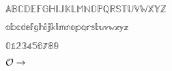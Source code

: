 \documentclass{article}
\begin{document}
$\mathbb{A} \mathbb{B} \mathbb{C} \mathbb{D} \mathbb{E} \mathbb{F} \mathbb{G} \mathbb{H} \mathbb{I} \mathbb{J} \mathbb{K} \mathbb{L} \mathbb{M} \mathbb{N} \mathbb{O} \mathbb{P} \mathbb{Q} \mathbb{R} \mathbb{S} \mathbb{T} \mathbb{U} \mathbb{V} \mathbb{W} \mathbb{X} \mathbb{Y} \mathbb{Z}$

$\mathbb{a} \mathbb{b} \mathbb{c} \mathbb{d} \mathbb{e} \mathbb{f} \mathbb{g} \mathbb{h} \mathbb{i} \mathbb{j} \mathbb{k} \mathbb{l} \mathbb{m} \mathbb{n} \mathbb{o} \mathbb{p} \mathbb{q} \mathbb{r} \mathbb{s} \mathbb{t} \mathbb{u} \mathbb{v} \mathbb{w} \mathbb{x} \mathbb{y} \mathbb{z}$

$\mathbb{0} \mathbb{1} \mathbb{2} \mathbb{3} \mathbb{4} \mathbb{5} \mathbb{6} \mathbb{7} \mathbb{8} \mathbb{9}$

$\cal{O} \rightarrow$
\end{document}
